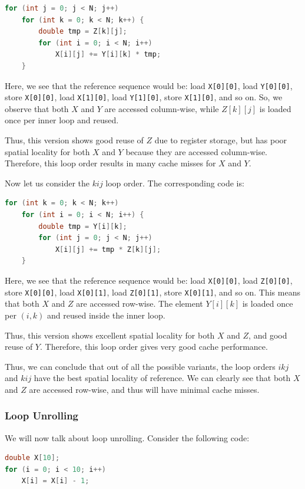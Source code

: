 \documentclass[12pt]{book}
\begin{document}
\begin{lstlisting}[language=C++, caption={Matrix multiplication with loop order jki}, label={lst:jki-matmul}]
for (int j = 0; j < N; j++)
    for (int k = 0; k < N; k++) {
        double tmp = Z[k][j];
        for (int i = 0; i < N; i++)
            X[i][j] += Y[i][k] * tmp;
    }
\end{lstlisting}

Here, we see that the reference sequence would be: load \texttt{X[0][0]}, load \texttt{Y[0][0]}, store \texttt{X[0][0]}, load \texttt{X[1][0]}, load \texttt{Y[1][0]}, store \texttt{X[1][0]}, and so on. So, we observe that both $X$ and $Y$ are accessed column-wise, while $Z[k][j]$ is loaded once per inner loop and reused.

Thus, this version shows good reuse of $Z$ due to register storage, but has poor spatial locality for both $X$ and $Y$ because they are accessed column-wise. Therefore, this loop order results in many cache misses for $X$ and $Y$.

Now let us consider the $kij$ loop order. The corresponding code is:

\begin{lstlisting}[language=C++, caption={Matrix multiplication with loop order kij}, label={lst:kij-matmul}]
for (int k = 0; k < N; k++)
    for (int i = 0; i < N; i++) {
        double tmp = Y[i][k];
        for (int j = 0; j < N; j++)
            X[i][j] += tmp * Z[k][j];
    }
\end{lstlisting}

Here, we see that the reference sequence would be: load \texttt{X[0][0]}, load \texttt{Z[0][0]}, store \texttt{X[0][0]}, load \texttt{X[0][1]}, load \texttt{Z[0][1]}, store \texttt{X[0][1]}, and so on. This means that both $X$ and $Z$ are accessed row-wise. The element $Y[i][k]$ is loaded once per $(i,k)$ and reused inside the inner loop.

Thus, this version shows excellent spatial locality for both $X$ and $Z$, and good reuse of $Y$. Therefore, this loop order gives very good cache performance.

Thus, we can conclude that out of all the possible variants, the loop orders $ikj$ and $kij$ have the best spatial locality of reference. We can clearly see that both $X$ and $Z$ are accessed row-wise, and thus will have minimal cache misses.

\subsubsection*{Loop Unrolling}
We will now talk about loop unrolling. Consider the following code:
\begin{lstlisting}[language=C++, caption = Loop Unrolling]
double X[10];
for (i = 0; i < 10; i++)
    X[i] = X[i] - 1;
\end{lstlisting}
\end{document}
